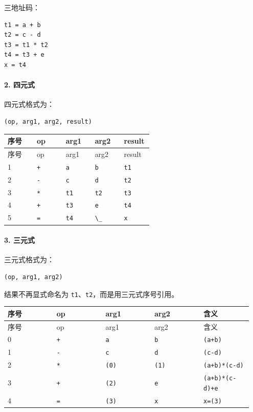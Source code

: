 \documentclass[UTF8]{ctexart}
\begin{document}
三地址码：

\begin{Verbatim}[fontsize=\small,breaklines=true]
t1 = a + b
t2 = c - d
t3 = t1 * t2
t4 = t3 + e
x = t4
\end{Verbatim}

\paragraph*{2. 四元式}

四元式格式为：

\begin{Verbatim}[fontsize=\small,breaklines=true]
(op, arg1, arg2, result)
\end{Verbatim}

\begin{longtable}{|p{0.19\linewidth}|p{0.19\linewidth}|p{0.19\linewidth}|p{0.19\linewidth}|p{0.19\linewidth}|}
\hline
序号 & op & arg1 & arg2 & result \\
\hline
\endfirsthead
序号 & op & arg1 & arg2 & result \\
\hline
\endhead
1 & \texttt{+} & \texttt{a} & \texttt{b} & \texttt{t1} \\
\hline
2 & \texttt{-} & \texttt{c} & \texttt{d} & \texttt{t2} \\
\hline
3 & \texttt{*} & \texttt{t1} & \texttt{t2} & \texttt{t3} \\
\hline
4 & \texttt{+} & \texttt{t3} & \texttt{e} & \texttt{t4} \\
\hline
5 & \texttt{=} & \texttt{t4} & \texttt{\textbackslash{}\_} & \texttt{x} \\
\hline
\end{longtable}

\paragraph*{3. 三元式}

三元式格式为：

\begin{Verbatim}[fontsize=\small,breaklines=true]
(op, arg1, arg2)
\end{Verbatim}

结果不再显式命名为 \texttt{t1}、\texttt{t2}，而是用三元式序号引用。

\begin{longtable}{|p{0.19\linewidth}|p{0.19\linewidth}|p{0.19\linewidth}|p{0.19\linewidth}|p{0.19\linewidth}|}
\hline
序号 & op & arg1 & arg2 & 含义 \\
\hline
\endfirsthead
序号 & op & arg1 & arg2 & 含义 \\
\hline
\endhead
0 & \texttt{+} & \texttt{a} & \texttt{b} & \texttt{(a+b)} \\
\hline
1 & \texttt{-} & \texttt{c} & \texttt{d} & \texttt{(c-d)} \\
\hline
2 & \texttt{*} & \texttt{(0)} & \texttt{(1)} & \texttt{(a+b)*(c-d)} \\
\hline
3 & \texttt{+} & \texttt{(2)} & \texttt{e} & \texttt{(a+b)*(c-d)+e} \\
\hline
4 & \texttt{=} & \texttt{(3)} & \texttt{x} & \texttt{x=(3)} \\
\hline
\end{longtable}
\end{document}
